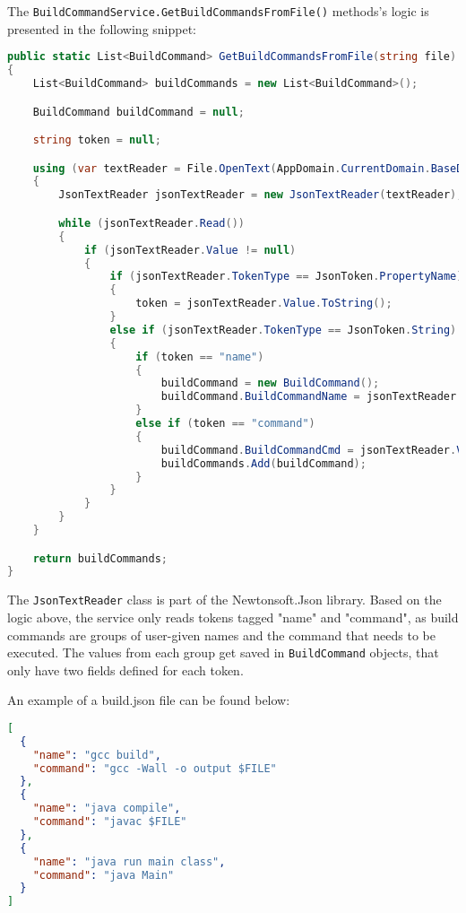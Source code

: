 The \texttt{BuildCommandService.GetBuildCommandsFromFile()} methods's logic is presented in the following snippet:

\begin{lstlisting}[language=csharp, caption={Reading build commands saved in the configuration file through the BuildCommandService}]
public static List<BuildCommand> GetBuildCommandsFromFile(string file)
{
    List<BuildCommand> buildCommands = new List<BuildCommand>();

    BuildCommand buildCommand = null;

    string token = null;

    using (var textReader = File.OpenText(AppDomain.CurrentDomain.BaseDirectory + file))
    {
        JsonTextReader jsonTextReader = new JsonTextReader(textReader);

        while (jsonTextReader.Read())
        {
            if (jsonTextReader.Value != null)
            {
                if (jsonTextReader.TokenType == JsonToken.PropertyName)
                {
                    token = jsonTextReader.Value.ToString();
                }
                else if (jsonTextReader.TokenType == JsonToken.String)
                {
                    if (token == "name")
                    {
                        buildCommand = new BuildCommand();
                        buildCommand.BuildCommandName = jsonTextReader.Value.ToString();
                    }
                    else if (token == "command")
                    {
                        buildCommand.BuildCommandCmd = jsonTextReader.Value.ToString();
                        buildCommands.Add(buildCommand);
                    }
                }
            }
        }
    }

    return buildCommands;
}
\end{lstlisting}

The \texttt{JsonTextReader} class is part of the Newtonsoft.Json library. Based on the logic above, the service only reads tokens tagged "name" and "command", as build commands are groups of user-given names and the command that needs to be executed. The values from each group get saved in \texttt{BuildCommand} objects, that only have two fields defined for each token.

An example of a build.json file can be found below:

\begin{lstlisting}[language=json, caption={Structure of the JSON-formatted build commands file in Pie}]
[
  {
    "name": "gcc build",
    "command": "gcc -Wall -o output $FILE"
  },
  {
    "name": "java compile",
    "command": "javac $FILE"
  },
  {
    "name": "java run main class",
    "command": "java Main"
  }
]
\end{lstlisting}

